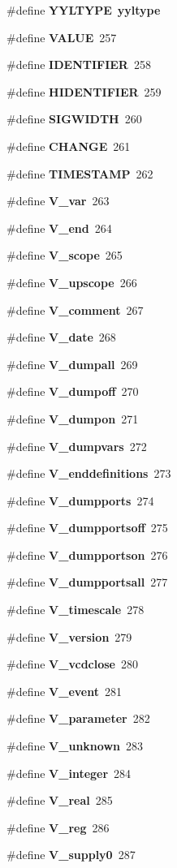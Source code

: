 \begin{CompactItemize}
\item 
\#define {\bf YYLTYPE}\ {\bf yyltype}
\item 
\#define {\bf VALUE}\ 257
\item 
\#define {\bf IDENTIFIER}\ 258
\item 
\#define {\bf HIDENTIFIER}\ 259
\item 
\#define {\bf SIGWIDTH}\ 260
\item 
\#define {\bf CHANGE}\ 261
\item 
\#define {\bf TIMESTAMP}\ 262
\item 
\#define {\bf V\_\-var}\ 263
\item 
\#define {\bf V\_\-end}\ 264
\item 
\#define {\bf V\_\-scope}\ 265
\item 
\#define {\bf V\_\-upscope}\ 266
\item 
\#define {\bf V\_\-comment}\ 267
\item 
\#define {\bf V\_\-date}\ 268
\item 
\#define {\bf V\_\-dumpall}\ 269
\item 
\#define {\bf V\_\-dumpoff}\ 270
\item 
\#define {\bf V\_\-dumpon}\ 271
\item 
\#define {\bf V\_\-dumpvars}\ 272
\item 
\#define {\bf V\_\-enddefinitions}\ 273
\item 
\#define {\bf V\_\-dumpports}\ 274
\item 
\#define {\bf V\_\-dumpportsoff}\ 275
\item 
\#define {\bf V\_\-dumpportson}\ 276
\item 
\#define {\bf V\_\-dumpportsall}\ 277
\item 
\#define {\bf V\_\-timescale}\ 278
\item 
\#define {\bf V\_\-version}\ 279
\item 
\#define {\bf V\_\-vcdclose}\ 280
\item 
\#define {\bf V\_\-event}\ 281
\item 
\#define {\bf V\_\-parameter}\ 282
\item 
\#define {\bf V\_\-unknown}\ 283
\item 
\#define {\bf V\_\-integer}\ 284
\item 
\#define {\bf V\_\-real}\ 285
\item 
\#define {\bf V\_\-reg}\ 286
\item 
\#define {\bf V\_\-supply0}\ 287

\end{CompactItemize}

